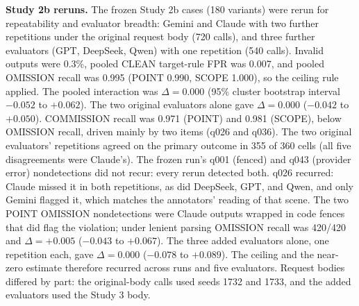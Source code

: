 \documentclass{ieeeaccess}
\begin{document}
\textbf{Study 2b reruns.} The frozen Study 2b cases (180 variants) were rerun for repeatability and evaluator breadth: Gemini and Claude with two further repetitions under the original request body (720 calls), and three further evaluators (GPT, DeepSeek, Qwen) with one repetition (540 calls). Invalid outputs were 0.3\%, pooled CLEAN target-rule FPR was 0.007, and pooled OMISSION recall was 0.995 (POINT 0.990, SCOPE 1.000), so the ceiling rule applied. The pooled interaction was $\Delta=0.000$ (95\% cluster bootstrap interval $-0.052$ to $+0.062$). The two original evaluators alone gave $\Delta=0.000$ ($-0.042$ to $+0.050$). COMMISSION recall was 0.971 (POINT) and 0.981 (SCOPE), below OMISSION recall, driven mainly by two items (q026 and q036). The two original evaluators' repetitions agreed on the primary outcome in 355 of 360 cells (all five disagreements were Claude's). The frozen run's q001 (fenced) and q043 (provider error) nondetections did not recur: every rerun detected both. q026 recurred: Claude missed it in both repetitions, as did DeepSeek, GPT, and Qwen, and only Gemini flagged it, which matches the annotators' reading of that scene. The two POINT OMISSION nondetections were Claude outputs wrapped in code fences that did flag the violation; under lenient parsing OMISSION recall was 420/420 and $\Delta=+0.005$ ($-0.043$ to $+0.067$). The three added evaluators alone, one repetition each, gave $\Delta=0.000$ ($-0.078$ to $+0.089$). The ceiling and the near-zero estimate therefore recurred across runs and five evaluators. Request bodies differed by part: the original-body calls used seeds 1732 and 1733, and the added evaluators used the Study 3 body.
\end{document}
